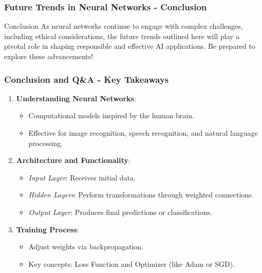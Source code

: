 \documentclass[aspectratio=169]{beamer}
\begin{document}
\begin{frame}[fragile]
    \frametitle{Future Trends in Neural Networks - Conclusion}
    \begin{block}{Conclusion}
        As neural networks continue to engage with complex challenges, including ethical considerations, the future trends outlined here will play a pivotal role in shaping responsible and effective AI applications. Be prepared to explore these advancements!
    \end{block}
\end{frame}

\begin{frame}[fragile]
    \frametitle{Conclusion and Q\&A - Key Takeaways}
    \begin{enumerate}
        \item \textbf{Understanding Neural Networks}:
            \begin{itemize}
                \item Computational models inspired by the human brain.
                \item Effective for image recognition, speech recognition, and natural language processing.
            \end{itemize}
        \item \textbf{Architecture and Functionality}:
            \begin{itemize}
                \item \textit{Input Layer}: Receives initial data.
                \item \textit{Hidden Layers}: Perform transformations through weighted connections.
                \item \textit{Output Layer}: Produces final predictions or classifications.
            \end{itemize}
        \item \textbf{Training Process}:
            \begin{itemize}
                \item Adjust weights via backpropagation.
                \item Key concepts: Loss Function and Optimizer (like Adam or SGD).
            \end{itemize}
    \end{enumerate}
\end{frame}
\end{document}
